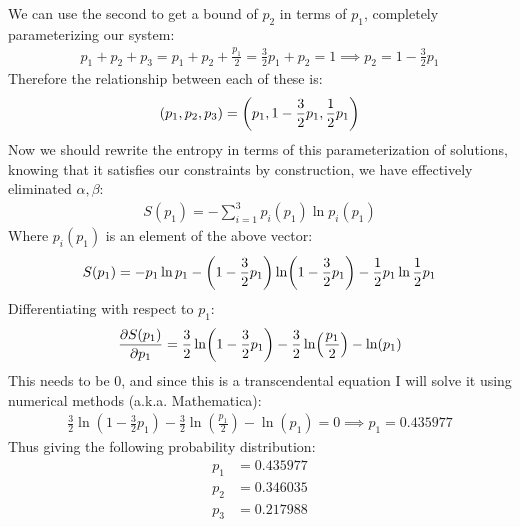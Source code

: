 \documentclass[12pt]{article}
\begin{document}
We can use the second to get a bound of $p_2$ in terms of $p_1$, completely parameterizing our system:
\begin{align*}
  p_1+p_2+p_3=p_1+p_2+\frac{p_1}{2}=\frac32p_1+p_2=1\implies p_2=1-\frac32p_1
\end{align*}
Therefore the relationship between each of these is:
\begin{align*}
  (p_1,p_2,p_3)=\qty(p_1,1-\frac32p_1,\frac12p_1)
\end{align*}
Now we should rewrite the entropy in terms of this parameterization of solutions, knowing that it satisfies our constraints by construction, we have effectively eliminated $\alpha,\beta$:
\begin{align*}
  S(p_1)=-\sum_{i=1}^3p_i(p_1)\ln p_i(p_1)
\end{align*}
Where $p_i(p_1)$ is an element of the above vector:
\begin{align*}
  S(p_1)=-p_1\ln p_1-\qty(1-\frac32p_1)\ln(1-\frac32p_1)-\frac12p_1\ln\frac12p_1
\end{align*}
Differentiating with respect to $p_1$:
\begin{align*}
  \pdv{S(p_1)}{p_1}=\frac32\ln(1-\frac32p_1)-\frac32\ln(\frac{p_1}2)-\ln(p_1)
\end{align*}
This needs to be $0$, and since this is a transcendental equation I will solve it using numerical methods (a.k.a. Mathematica):
\begin{align*}
  \frac32\ln(1-\frac32p_1)-\frac32\ln(\frac{p_1}2)-\ln(p_1)=0\implies
  p_1=0.435977
\end{align*}
Thus giving the following probability distribution:
\begin{equation}
  \boxed{
    \begin{aligned}
      p_1&=0.435977\\
      p_2&=0.346035\\
      p_3&=0.217988
    \end{aligned}
  }
\end{equation}
\end{document}
